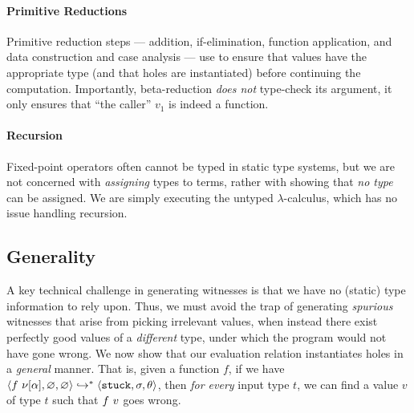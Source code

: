 \paragraph{Primitive Reductions}
%
%
Primitive reduction steps --- addition, if-elimination,
function application, and data construction and case
analysis --- use \forcesym to ensure that values have
the appropriate type (and that holes are instantiated)
before continuing the computation.
%
Importantly, beta-reduction \emph{does not} type-check its
argument, it only ensures that ``the caller'' $v_1$ is indeed
a function.

\paragraph{Recursion}
Fixed-point operators often cannot be typed in static type
systems, but we are not concerned with \emph{assigning}
types to terms, rather with showing that \emph{no type}
can be assigned.
%
We are simply executing the untyped $\lambda$-calculus,
which has no issue handling recursion.



\subsection{Generality}\label{sec:soundness}

A key technical challenge in generating witnesses is
that we have no (static) type information to rely upon.
%
Thus, we must avoid the trap of generating \emph{spurious}
witnesses that arise from picking irrelevant values, when
instead there exist perfectly good values of a \emph{different}
type, under which the program would not have gone wrong.
%
We now show that our evaluation relation instantiates holes
in a \emph{general} manner. That is, given a function $f$,
if we have $\langle f\ \nu[\alpha], \varnothing, \varnothing \rangle \hookrightarrow^{*} \langle \mathtt{stuck}, \sigma, \theta \rangle{}$,
then \emph{for every} input type $t$, we can find a value
$v$ of type $t$ such that $f\ v$ goes wrong.

